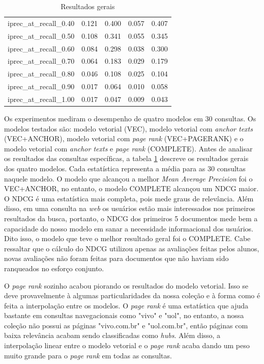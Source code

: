 \documentclass{article}
\begin{document}
\begin{table}
\begin{tabular}{ |l|l|l|l|l| }
  iprec\_at\_recall\_0.40  & 0.121 & 0.400 & 0.057 & 0.407 \\
  iprec\_at\_recall\_0.50  & 0.108 & 0.341 & 0.055 & 0.345 \\
  iprec\_at\_recall\_0.60  & 0.084 & 0.298 & 0.038 & 0.300 \\
  iprec\_at\_recall\_0.70  & 0.064 & 0.183 & 0.029 & 0.179 \\
  iprec\_at\_recall\_0.80  & 0.046 & 0.108 & 0.025 & 0.104 \\
  iprec\_at\_recall\_0.90  & 0.017 & 0.064 & 0.010 & 0.058 \\
  iprec\_at\_recall\_1.00  & 0.017 & 0.047 & 0.009 & 0.043 \\
  \hline
\end{tabular}
\caption{Resultados gerais}
\label{tab:general_results}
\end{table}

Os experimentos mediram o desempenho de quatro modelos em 30 consultas. Os modelos testados são: 
modelo vetorial (VEC), modelo vetorial com \textit{anchor texts} (VEC+ANCHOR), 
modelo vetorial com \textit{page rank} (VEC+PAGERANK) e o modelo vetorial com \textit{anchor texts} e \textit{page rank} (COMPLETE).
Antes de analisar os resultados das consultas específicas, a tabela \ref{tab:general_results} descreve
os resultados gerais dos quatro modelos. Cada estatística representa a média para
as 30 consultas naquele modelo. O modelo que alcançou a melhor \textit{Mean Average Precision} 
foi o VEC+ANCHOR, no entanto, o modelo COMPLETE alcançou um NDCG maior. O NDCG é uma estatística mais completa, pois mede graus de relevância. 
Além disso, em uma consulta na \textit{web} os usuários estão mais interessados nos primeiros resultados da busca, portanto,
o NDCG dos primeiros 5 documentos mede bem a capacidade do nosso modelo em sanar a necessidade informacional
dos usuários. Dito isso, o modelo que teve o melhor resultado geral foi o COMPLETE. Cabe ressaltar que o cálculo do NDCG
utilizou apenas as avaliações feitas pelos alunos, novas avaliações não foram feitas para documentos que não haviam
sido ranqueados no esforço conjunto.

O \textit{page rank} sozinho acabou piorando os resultados do modelo vetorial. Isso se deve provavelmente à 
algumas particularidades da nossa coleção e à forma como é feita a interpolação entre os modelos.
O \textit{page rank} é uma estatística que ajuda bastante em consultas navegacionais como "vivo" e "uol", no entanto, a nossa
coleção não possui as páginas "vivo.com.br" e "uol.com.br", então páginas com baixa relevância acabam sendo classificadas como
\textit{hubs}. Além disso, a interpolação linear entre o modelo vetorial e o \textit{page rank} acaba dando um peso muito grande
para o \textit{page rank} em todas as consultas.
\end{document}

